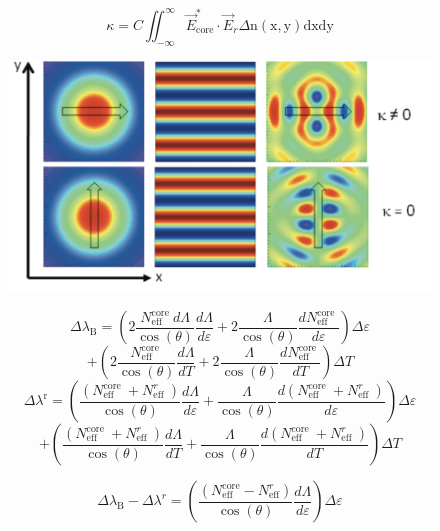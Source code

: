 \documentclass[t]{beamer}  %
\begin{document}
\begin{frame}
	
	$$\kappa=C \iint_{-\infty}^{\infty} \vec{E}_{\mathrm{core}}^{*} \cdot \vec{E}_{r} \Delta \mathrm{n}(\mathrm{x}, \mathrm{y}) \mathrm{d} \mathrm{xdy}$$
	
	\begin{figure}
		\centering
		\includegraphics[width=0.7\linewidth]{screenshot001}
		\caption{}
		\label{fig:screenshot001}
	\end{figure}
	
	
\end{frame}	


\begin{frame}
	$$
	\Delta \lambda_{\mathrm{B}}=\left(2 \frac{N_{\mathrm{eff}}^{\text {core }} d \Lambda}{\cos (\theta)} \frac{d \Lambda}{d \varepsilon}+2 \frac{\Lambda}{\cos (\theta)} \frac{d N_{\text {eff }}^{\text {core }}}{d \varepsilon}\right) \Delta \varepsilon $$
	$$
	+\left(2 \frac{N_{\text {eff }}^{\text {core }}}{\cos (\theta)} \frac{d \Lambda}{d T}+2 \frac{\Lambda}{\cos (\theta)} \frac{d N_{\text {eff }}^{\text {core }}}{d T}\right) \Delta T $$
	$$
	\Delta \lambda^{\mathrm{r}}=\left(\frac{\left(N_{\text {eff }}^{\text {core }}+N_{\text {eff }}^{r}\right)}{\cos (\theta)} \frac{d \Lambda}{d \varepsilon}+\frac{\Lambda}{\cos (\theta)} \frac{d\left(N_{\text {eff }}^{\text {core }}+N_{\text {eff }}^{r}\right)}{d \varepsilon}\right)  \Delta \varepsilon $$
	$$
	+\left(\frac{\left(N_{\text {eff }}^{\text {core }}+N_{\text {eff }}^{r}\right)}{\cos (\theta)} \frac{d \Lambda}{d T}+\frac{\Lambda}{\cos (\theta)} \frac{d\left(N_{\text {eff }}^{\text {core }}+N_{\text {eff }}^{r}\right)}{d T}\right) \Delta T
	$$
	
	
	$$\Delta \lambda_{\mathrm{B}}-\Delta \lambda^{r}=\left(\frac{\left(N_{\mathrm{eff}}^{\mathrm{core}}-N_{\mathrm{eff}}^{r}\right)}{\cos (\theta)} \frac{d \Lambda}{d \varepsilon}\right) \Delta \varepsilon
	$$
\end{frame}	
\end{document}
